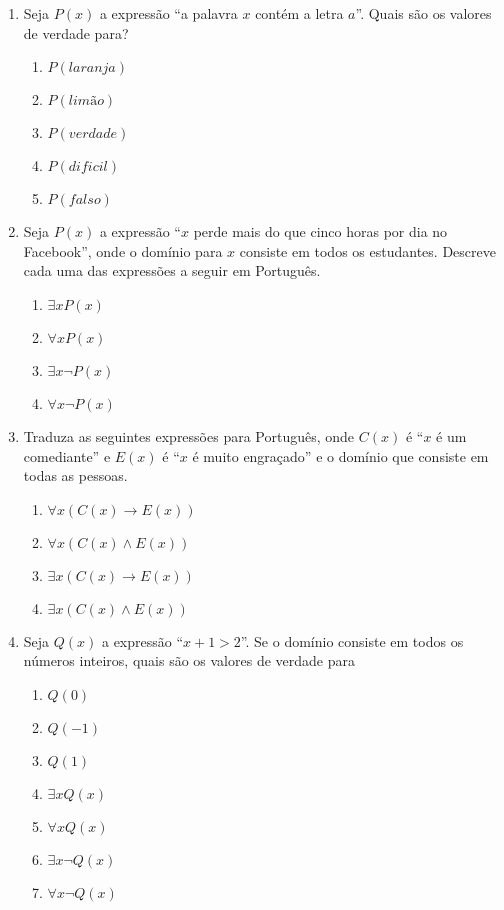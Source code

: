 \begin{enumerate}
  	\item Seja $P(x)$ a expressão ``a palavra $x$ contém a letra $a$''. Quais são os valores de verdade para?
  	\begin{enumerate}
    	\item $P(laranja)$ \item $P(limão)$ \item $P(verdade)$ \item $P(dificil)$ \item $P(falso)$
    \end{enumerate}
    \item Seja $P(x)$ a expressão ``$x$ perde mais do que cinco horas por dia no Facebook'', onde o domínio para $x$ consiste
    em todos os estudantes. Descreve cada uma das expressões a seguir em Português.
    \begin{enumerate}
    	\item $\exists xP(x)$ \item $\forall xP(x)$ \item $\exists x \lnot P(x)$ \item $\forall x \lnot P(x)$ 
	\end{enumerate}
	\item Traduza as seguintes expressões para Português, onde $C(x)$ é ``$x$ é um comediante'' e $E(x)$ é ``$x$ é muito 
	engraçado'' e o domínio que consiste em todas as pessoas.
	\begin{enumerate}
		\item $\forall x(C(x) \to E(x))$ \item $\forall x(C(x) \land E(x))$ 
		\item $\exists x(C(x) \to E(x))$ \item $\exists x(C(x) \land E(x))$
	\end{enumerate}
	\item Seja $Q(x)$ a expressão ``$x+1 > 2$''. Se o domínio consiste em todos os números inteiros, quais são os valores
	de verdade para
	\begin{enumerate}
		\item $Q(0)$ \item $Q(-1)$ \item $Q(1)$ 
		\item $\exists xQ(x)$ \item $\forall xQ(x)$ 
		\item $\exists x \lnot Q(x)$ \item $\forall x \lnot Q(x)$
	\end{enumerate}
	

\end{enumerate}
